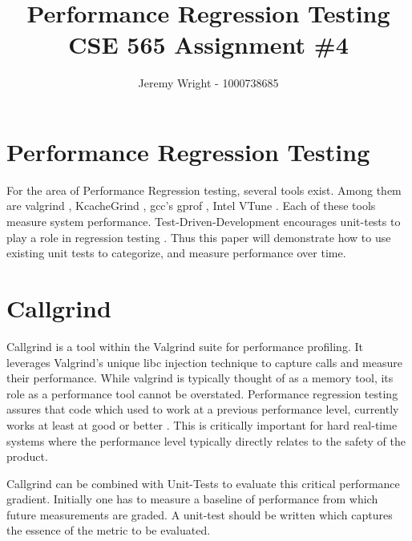 \documentclass[12pt,journal]{article}
\begin{document}
\doublespace
\title{Performance Regression Testing\\ CSE 565 Assignment \#4}
\author{Jeremy Wright - 1000738685}

\maketitle

\section{Performance Regression Testing}
For the area of Performance Regression testing, several tools exist. Among them
are valgrind \autocite{_valgrind_2014}, KcacheGrind
\autocite{_kcachegrind_????}, gcc's gprof \autocite{_gnu_????},  Intel VTune
\autocite{_vtune_2014}. Each of these
tools measure system performance. Test-Driven-Development encourages unit-tests
to play a role in regression testing \autocite{_regression_2014}. Thus this
paper will demonstrate how to use existing unit tests to categorize, and
measure performance over time. 

\section{Callgrind}
Callgrind is a tool within the Valgrind suite for performance profiling. It
leverages Valgrind's unique libc injection technique to capture calls and
measure their performance. While valgrind is typically thought of as a memory
tool, its role as a performance tool cannot be overstated. Performance regression testing
assures that code which used to work at a previous performance level, currently works at
least at good or better \autocite{_regression_2014}. This is critically
important for hard real-time systems where the performance level typically
directly relates to the safety of the product. 

Callgrind can be combined with Unit-Tests to evaluate this critical performance
gradient. Initially one has to measure a baseline of performance from which
future measurements are graded. A unit-test should be written which captures the
essence of the metric to be evaluated. 





\clearpage
\printbibliography
\end{document}
